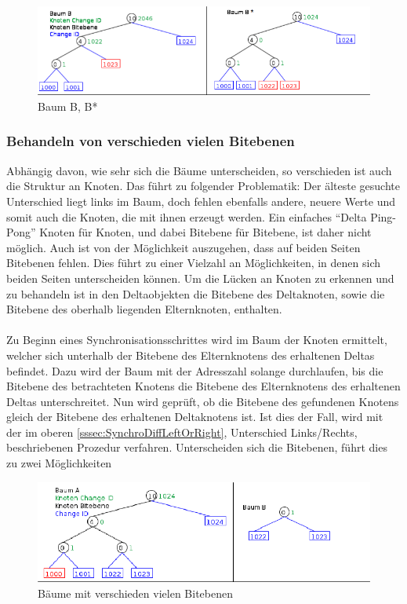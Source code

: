 \documentclass[a4paper,11pt,oneside,%
headsepline,												%
footsepline,												%
bibtotocnumbered									%
]{scrreprt}
\begin{document}
\begin{figure}[h!]
  \begin{center}
    \includegraphics[width=0.9\linewidth]{bilder/Case B Baeume.png}
  \end{center}
 \caption{Baum B, B*}
  \label{fig:Case1TreeB,B*}
\end{figure}
\subsubsection{Behandeln von verschieden vielen Bitebenen} 
Abhängig davon, wie sehr sich die Bäume unterscheiden, so verschieden ist auch die Struktur an Knoten. Das führt zu folgender Problematik: Der älteste gesuchte Unterschied liegt links im Baum, doch fehlen ebenfalls andere, neuere Werte und somit auch die Knoten, die mit ihnen erzeugt werden. Ein einfaches \enquote{Delta Ping-Pong} Knoten für Knoten, und dabei Bitebene für Bitebene, ist daher nicht möglich. Auch ist von der Möglichkeit auszugehen, dass auf beiden Seiten Bitebenen fehlen. Dies führt zu einer Vielzahl an Möglichkeiten, in denen sich beiden Seiten unterscheiden können. Um die Lücken an Knoten zu erkennen und zu behandeln ist in den Deltaobjekten die Bitebene des Deltaknoten, sowie die Bitebene des oberhalb liegenden Elternknoten, enthalten.\\\\
Zu Beginn eines Synchronisationsschrittes wird im Baum der Knoten ermittelt, welcher sich unterhalb der Bitebene des Elternknotens des erhaltenen Deltas befindet. Dazu wird der Baum mit der Adresszahl solange durchlaufen, bis die Bitebene des betrachteten Knotens die Bitebene des Elternknotens des erhaltenen Deltas unterschreitet. Nun wird geprüft, ob die Bitebene des gefundenen Knotens gleich der Bitebene des erhaltenen Deltaknotens ist. Ist dies der Fall, wird mit der im oberen \autoref{sssec:SynchroDiffLeftOrRight}, Unterschied Links/Rechts, beschriebenen Prozedur verfahren. Unterscheiden sich die Bitebenen, führt dies zu zwei Möglichkeiten 
\begin{figure}[h!]
  \begin{center}
    \includegraphics[width=0.9\linewidth]{bilder/case 2 a* B**.png}
  \end{center}
 \caption{Bäume mit verschieden vielen Bitebenen}
\end{figure}\\
\end{document}
